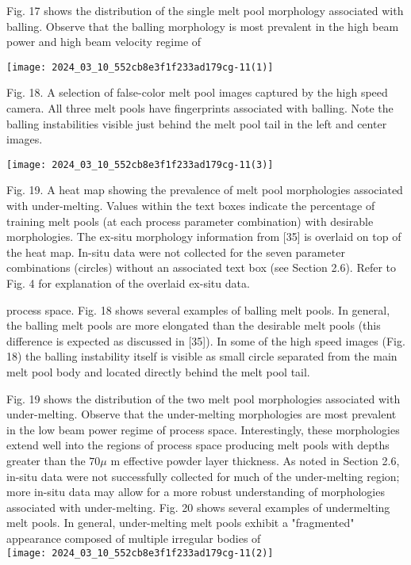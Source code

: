 \documentclass[10pt]{article}
\begin{document}
Fig. 17 shows the distribution of the single melt pool morphology associated with balling. Observe that the balling morphology is most prevalent in the high beam power and high beam velocity regime of

\begin{center}
\texttt{[image: 2024\_03\_10\_552cb8e3f1f233ad179cg-11(1)]}
\end{center}

Fig. 18. A selection of false-color melt pool images captured by the high speed camera. All three melt pools have fingerprints associated with balling. Note the balling instabilities visible just behind the melt pool tail in the left and center images.

\begin{center}
\texttt{[image: 2024\_03\_10\_552cb8e3f1f233ad179cg-11(3)]}
\end{center}

Fig. 19. A heat map showing the prevalence of melt pool morphologies associated with under-melting. Values within the text boxes indicate the percentage of training melt pools (at each process parameter combination) with desirable morphologies. The ex-situ morphology information from [35] is overlaid on top of the heat map. In-situ data were not collected for the seven parameter combinations (circles) without an associated text box (see Section 2.6). Refer to Fig. 4 for explanation of the overlaid ex-situ data.

process space. Fig. 18 shows several examples of balling melt pools. In general, the balling melt pools are more elongated than the desirable melt pools (this difference is expected as discussed in [35]). In some of the high speed images (Fig. 18) the balling instability itself is visible as small circle separated from the main melt pool body and located directly behind the melt pool tail.

Fig. 19 shows the distribution of the two melt pool morphologies associated with under-melting. Observe that the under-melting morphologies are most prevalent in the low beam power regime of process space. Interestingly, these morphologies extend well into the regions of process space producing melt pools with depths greater than the $70 \mu$ m effective powder layer thickness. As noted in Section 2.6, in-situ data were not successfully collected for much of the under-melting region; more in-situ data may allow for a more robust understanding of morphologies associated with under-melting. Fig. 20 shows several examples of undermelting melt pools. In general, under-melting melt pools exhibit a "fragmented" appearance composed of multiple irregular bodies of\\
\texttt{[image: 2024\_03\_10\_552cb8e3f1f233ad179cg-11(2)]}
\end{document}
